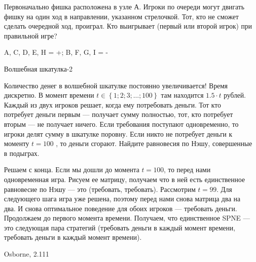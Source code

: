 \begin{problem}

Первоначально фишка расположена в узле А. Игроки по очереди могут двигать фишку на один ход в направлении, указанном стрелочкой. Тот, кто не сможет сделать очередной ход, проиграл. Кто выигрывает (первый или второй игрок) при правильной игре?



\begin{sol}
 A, C, D, E, H = +; B, F, G, I = -
\end{sol}
\end{problem}



\begin{problem}
 Волшебная шкатулка-2 \par %
Количество денег в волшебной шкатулке постоянно увеличивается! Время дискретно. В момент времени  $t\in \left\{1;2;3;\ldots ;100\right\}$  там находится  $1.5\cdot t$  рублей. Каждый из двух игроков решает, когда ему потребовать деньги. Тот кто потребует деньги первым — получает сумму полностью, тот, кто потребует вторым — не получает ничего. Если требования поступают одновременно, то игроки делят сумму в шкатулке поровну. Если никто не потребует деньги к моменту  $t=100$ , то деньги сгорают. Найдите равновесия по Нэшу, совершенные в подыграх.\par




\begin{sol}
Решаем с конца. Если мы дошли до момента $t=100$, то перед нами одновременная игра. Рисуем ее матрицу, получаем что в ней есть единственное равновесие по Нэшу — это (требовать, требовать). Рассмотрим $t=99$. Для следующего шага игра уже решена, поэтому перед нами снова матрица два на два. И снова оптимальное поведение для обоих игроков — требовать деньги. Продолжаем до первого момента времени. Получаем, что единственное SPNE — это следующая пара стратегий (требовать деньги в каждый момент времени, требовать деньги в каждый момент времени).
\end{sol}
\end{problem}


\begin{source}
Osborne, 2.111
\end{source}



